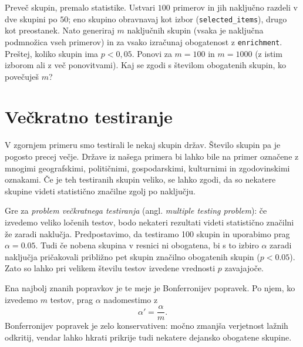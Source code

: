 \begin{exercise}{Preveč skupin, premalo statistike.}
  Ustvari $100$ primerov in jih naključno razdeli v dve skupini po $50$; eno skupino obravnavaj kot izbor (\texttt{selected\_items}), drugo kot preostanek. Nato generiraj $m$ naključnih skupin (vsaka je naključna podmnožica vseh primerov) in za vsako izračunaj obogatenost z \texttt{enrichment}. Preštej, koliko skupin ima $p<0{,}05$. Ponovi za $m=100$ in $m=1000$ (z istim izborom ali z več ponovitvami). Kaj se zgodi s številom obogatenih skupin, ko povečuješ $m$?
\end{exercise}  

\section{Večkratno testiranje}

V zgornjem primeru smo testirali le nekaj skupin držav. Število skupin pa je pogosto precej večje. Države iz našega primera bi lahko bile na primer označene z mnogimi geografskimi, političnimi, gospodarskimi, kulturnimi in zgodovinskimi oznakami. Če je teh testiranih skupin veliko, se lahko zgodi, da so nekatere skupine videti statistično značilne zgolj po naključju.

Gre za {\em problem večkratnega testiranja} (angl. {\em multiple testing problem}): če izvedemo veliko ločenih testov, bodo nekateri rezultati videti statistično značilni že zaradi naklučja. Predpostavimo, da testiramo 100 skupin in uporabimo prag $\alpha = 0.05$. Tudi če nobena skupina v resnici ni obogatena, bi s to izbiro $\alpha$ zaradi naključja pričakovali približno pet skupin značilno obogatenih skupin ($p < 0.05$). Zato so lahko pri velikem številu testov izvedene vrednosti $p$ zavajajoče.

Ena najbolj znanih popravkov je te meje je Bonferronijev popravek.
%
%
Po njem, ko izvedemo $m$ testov, prag $\alpha$ nadomestimo z
\[
\alpha' = \frac{\alpha}{m}.
\]
Bonferronijev popravek je zelo konservativen: močno zmanjša verjetnost lažnih odkritij, vendar lahko hkrati prikrije tudi nekatere dejansko obogatene skupine.

